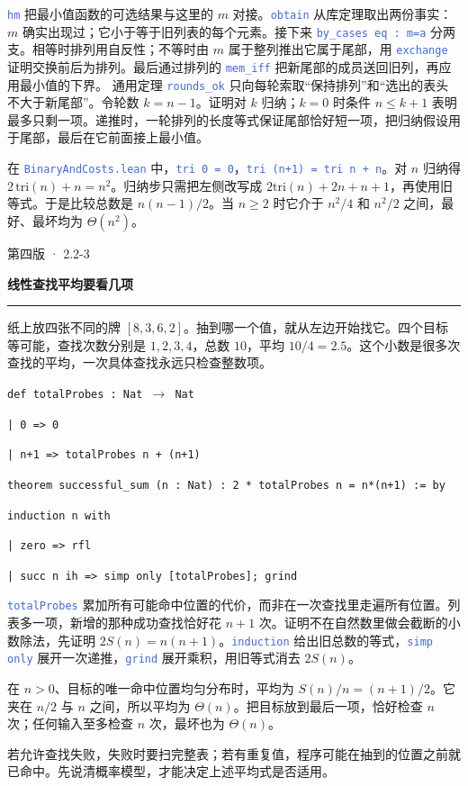 \documentclass[UTF8,11pt,a4paper,fontset=fandol]{ctexart}
\newcommand{\HandoutLesson}[2]{%
  \par{\small\heiti\color{BrickRed}#1}\par\vspace{3pt}
  {\fontsize{21}{27}\selectfont\heiti\bfseries #2}\par
  \textcolor{BrickRed}{\rule{\linewidth}{.7pt}}\par}
\newcommand{\HandoutBox}[1]{%
  \par\noindent\begingroup\setlength{\fboxsep}{8pt}%
  \colorbox{BrickRed!9}{\parbox{\dimexpr\linewidth-16pt\relax}{#1}}\endgroup\par}
\newcommand{\src}[1]{\textcolor{RoyalBlue}{\texttt{#1}}}
\newcommand{\subhead}[1]{\par\vspace{3pt}{\heiti\bfseries\color{RoyalBlue}#1}\par}
\newenvironment{leanblock}{\par\smallskip\noindent\begin{lrbox}{\leanbox}\begin{minipage}{\dimexpr\linewidth-12pt\relax}\raggedright\small\setlength{\parskip}{0pt}}{\end{minipage}\end{lrbox}\colorbox{RoyalBlue!6}{\usebox{\leanbox}}\par\smallskip}
\newcommand{\lineofcode}[2]{\noindent\hspace*{#1em}\strut\texttt{#2}\par}
\begin{document}
\src{hm} 把最小值函数的可选结果与这里的 $m$ 对接。\src{obtain} 从库定理取出两份事实：$m$ 确实出现过；它小于等于旧列表的每个元素。接下来 \src{by\_cases eq : m=a} 分两支。相等时排列用自反性；不等时由 $m$ 属于整列推出它属于尾部，用 \src{exchange} 证明交换前后为排列。最后通过排列的 \src{mem\_iff} 把新尾部的成员送回旧列，再应用最小值的下界。
通用定理 \src{rounds\_ok} 只向每轮索取“保持排列”和“选出的表头不大于新尾部”。令轮数 $k=n-1$。证明对 $k$ 归纳；$k=0$ 时条件 $n\le k+1$ 表明最多只剩一项。递推时，一轮排列的长度等式保证尾部恰好短一项，把归纳假设用于尾部，最后在它前面接上最小值。
\subhead{从六次比较推广到任意长度}
在 \src{BinaryAndCosts.lean} 中，\src{tri 0 = 0}，\src{tri (n+1) = tri n + n}。对 $n$ 归纳得 $2\,\mathrm{tri}(n)+n=n^2$。归纳步只需把左侧改写成 $2\mathrm{tri}(n)+2n+n+1$，再使用旧等式。于是比较总数是 $n(n-1)/2$。当 $n\ge2$ 时它介于 $n^2/4$ 和 $n^2/2$ 之间，最好、最坏均为 $\Theta(n^2)$。
\par{}
\clearpage{}\label{p28}\HandoutLesson{第四版 · 2.2-3}{线性查找平均要看几项}
纸上放四张不同的牌 $[8,3,6,2]$。抽到哪一个值，就从左边开始找它。四个目标等可能，查找次数分别是 $1,2,3,4$，总数 $10$，平均 $10/4=2.5$。这个小数是很多次查找的平均，一次具体查找永远只检查整数项。
\begin{leanblock}
\lineofcode{0.0}{def totalProbes : Nat \ensuremath{\to} Nat}
\lineofcode{0.9}{| 0 => 0}
\lineofcode{0.9}{| n+1 => totalProbes n + (n+1)}
\end{leanblock}
\begin{leanblock}
\lineofcode{0.0}{theorem successful\_sum (n : Nat) : 2 * totalProbes n = n*(n+1) := by}
\lineofcode{0.9}{induction n with}
\lineofcode{0.9}{| zero => rfl}
\lineofcode{0.9}{| succ n ih => simp only [totalProbes]; grind}
\end{leanblock}
\src{totalProbes} 累加所有可能命中位置的代价，而非在一次查找里走遍所有位置。列表多一项，新增的那种成功查找恰好花 $n+1$ 次。证明不在自然数里做会截断的小数除法，先证明 $2S(n)=n(n+1)$。\src{induction} 给出旧总数的等式，\src{simp only} 展开一次递推，\src{grind} 展开乘积，用旧等式消去 $2S(n)$。
\subhead{最后再取平均}
在 $n>0$、目标的唯一命中位置均匀分布时，平均为 $S(n)/n=(n+1)/2$。它夹在 $n/2$ 与 $n$ 之间，所以平均为 $\Theta(n)$。把目标放到最后一项，恰好检查 $n$ 次；任何输入至多检查 $n$ 次，最坏也为 $\Theta(n)$。
\HandoutBox{若允许查找失败，失败时要扫完整表；若有重复值，程序可能在抽到的位置之前就已命中。先说清概率模型，才能决定上述平均式是否适用。}
\end{document}

